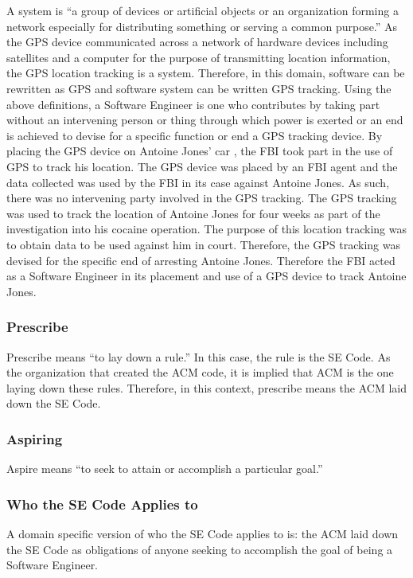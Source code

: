 \documentclass[12pt]{article}
\newcounter{subsubsubsection}[subsubsection]
\newcounter{subsubsubsubsection}[subsubsubsection]
\begin{document}
\begin{multicols}{2}
A system is ``a group of devices or artificial objects or an organization forming a network especially for distributing something or serving a common purpose.''\cite{dictionary}
As the GPS device communicated across a network of hardware devices including satellites and a computer for the purpose of transmitting location information, the GPS location tracking is a system.
Therefore, in this domain, software can be rewritten as GPS and software system can be written GPS tracking.
Using the above definitions, a Software Engineer is one who contributes by taking part without an intervening person or thing through which power is exerted or an end is achieved to devise for a specific function or end a GPS tracking device.
By placing the GPS device on Antoine Jones' car \cite{usvjonesopinions}, the FBI took part in the use of GPS to track his location.
The GPS device was placed by an FBI agent and the data collected was used by the FBI in its case against Antoine Jones. \cite{usvjonesopinions}
As such, there was no intervening party involved in the GPS tracking.
The GPS tracking  was used to track the location of Antoine Jones for four weeks as part of the investigation into his cocaine operation. \cite{maynarddecision}
The purpose of this location tracking was to obtain data to be used against him in court. Therefore, the GPS tracking was devised for the specific end of arresting Antoine Jones. 
Therefore the FBI acted as a Software Engineer in its placement and use of a GPS device to track Antoine Jones. 
\subsubsection{Prescribe}
Prescribe means ``to lay down a rule.''\cite{dictionary} In this case, the rule is the SE Code. 
As the organization that created the ACM code, it is implied that ACM is the one laying down these rules. \cite{secode}
Therefore, in this context, prescribe means the ACM laid down the SE Code.
\subsubsection{Aspiring}
Aspire means ``to seek to attain or accomplish a particular goal.''\cite{dictionary}
\subsubsection{Who the SE Code Applies to}
A domain specific version of who the SE Code applies to is: the ACM laid down the SE Code as obligations of anyone seeking to accomplish the goal of being a Software Engineer.

\end{multicols}
\end{document}
